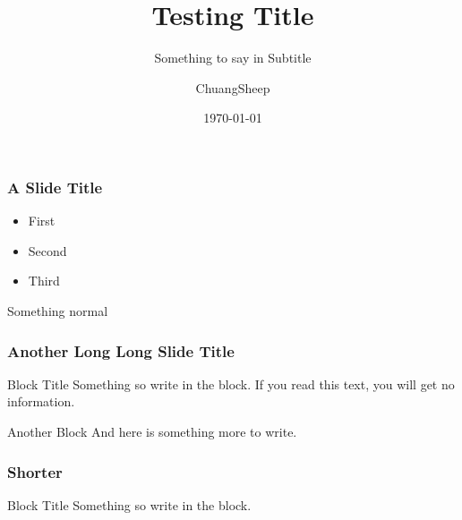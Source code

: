 \documentclass[american,aspectratio=169]{beamer}
\title{Testing Title}
\subtitle{Something to say in Subtitle}
\date{\today}
\author{ChuangSheep}
\begin{document}
\begin{frame} 
  \titlepage
\end{frame} 


\begin{iframe}
  \frametitle{A Slide Title}

  \begin{itemize}
    \item First
    \item Second 
    \item Third
  \end{itemize}

  Something normal
\end{iframe}

\begin{indentedframe}
  \frametitle{Another Long Long Slide Title}
  \begin{block}{Block Title}
    Something so write in the block. If you read this text, you will get no information. 
  \end{block}
  \begin{block}{Another Block}
    And here is something more to write. 
  \end{block}
\end{indentedframe}

\begin{indentedframe}
  \frametitle{Shorter}
  \begin{block}{Block Title}
    Something so write in the block. 
  \end{block}
\end{indentedframe}
\end{document}
